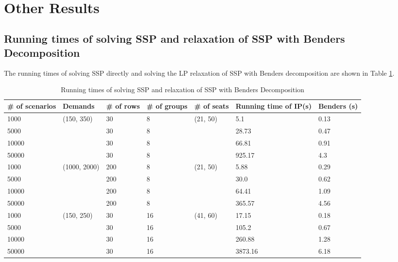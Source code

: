 
\section{Other Results}


\subsection{Running times of solving SSP and relaxation of SSP with Benders Decomposition}\label{Bender_IP}

The running times of solving SSP directly and solving the LP relaxation of SSP with Benders decomposition are shown in Table \ref{tab_1}.

\begin{table}[ht]
  \centering
  \scriptsize
  \caption{Running times of solving SSP and relaxation of SSP with Benders Decomposition}\label{tab_1}
  \begin{tabular}{|l|l|l|l|l|l|l|}
  \hline
  \# of scenarios & Demands & \# of rows & \# of groups & \# of seats & Running time of IP(s) & Benders (s) \\
  \hline
  1000  & (150, 350) & 30 & 8 & (21, 50) & 5.1  & 0.13 \\
  5000  &            & 30 & 8 &         & 28.73 & 0.47  \\
  10000 &            & 30 & 8 &         & 66.81  & 0.91 \\
  50000 &            & 30 & 8 &         & 925.17 & 4.3 \\
  \hline
  1000  & (1000, 2000) & 200 & 8 & (21, 50) & 5.88 & 0.29 \\
  5000  &              & 200 & 8 &          & 30.0 & 0.62 \\
  10000 &              & 200 & 8 &          & 64.41 & 1.09 \\
  50000 &              & 200 & 8 &          & 365.57 & 4.56\\
  \hline
  1000  & (150, 250) & 30 & 16 & (41, 60) & 17.15  & 0.18 \\
  5000  &            & 30 & 16 &          & 105.2  & 0.67 \\
  10000 &            & 30 & 16 &          & 260.88 & 1.28 \\
  50000 &            & 30 & 16 &          & 3873.16 & 6.18 \\
  \hline
  \end{tabular}
\end{table}

